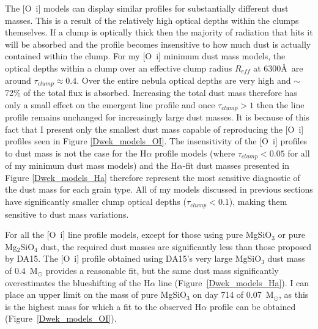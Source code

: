 The [O~{\sc i}] models can display similar profiles for substantially 
different dust masses.  This is a result of the relatively high optical 
depths within the clumps themselves. If a clump is optically thick then 
the majority of radiation that hits it will be absorbed and the profile 
becomes insensitive to how much dust is actually contained within the 
clump.  For my [O~{\sc i}] minimum dust mass models, the optical depths 
within a clump over an effective clump radius $R_{eff}$ at 6300\AA\ are 
around $\tau_{clump} \approx 0.4$.  Over the entire nebula optical depths 
are very high and $\sim$72\% of the total flux is absorbed.  Increasing the 
total dust mass therefore has only a small effect on the emergent line 
profile and once $\tau_{clump}>1$ then the line profile remains unchanged 
for increasingly large dust masses.  It is because of this fact that I 
present only the smallest dust mass capable of reproducing the [O~{\sc i}] 
profiles seen in Figure \ref{Dwek_models_OI}.  The insensitivity of the 
[O~{\sc i}] profiles to dust mass is not the case for the H$\alpha$ 
profile models (where $\tau_{clump} < 0.05$ for all of my minimum dust mass models) and the 
H$\alpha$-fit dust masses presented in Figure \ref{Dwek_models_Ha} 
therefore represent the most sensitive diagnostic of the dust mass for 
each grain type.  All of my models discussed in previous sections have 
significantly smaller clump optical depths ($\tau_{clump}<0.1$), making 
them sensitive to dust mass variations.

For all the [O~{\sc i}] line profile models, except for those using pure 
MgSiO$_3$ or pure Mg$_2$SiO$_4$ dust, the required dust masses are 
significantly less than those proposed by DA15. The [O~{\sc i}] profile 
obtained using DA15's very large MgSiO$_3$ dust mass of 0.4~M$_{\odot}$ 
provides a reasonable fit, but the same dust mass significantly 
overestimates the blueshifting of the H$\alpha$ line 
(Figure~\ref{Dwek_models_Ha}). I can place an upper limit on the 
mass of pure MgSiO$_3$ on day 714 of 0.07~M$_\odot$, as this 
is the highest mass for which a fit to the observed H$\alpha$ profile can 
be obtained (Figure~\ref{Dwek_models_OI}).

